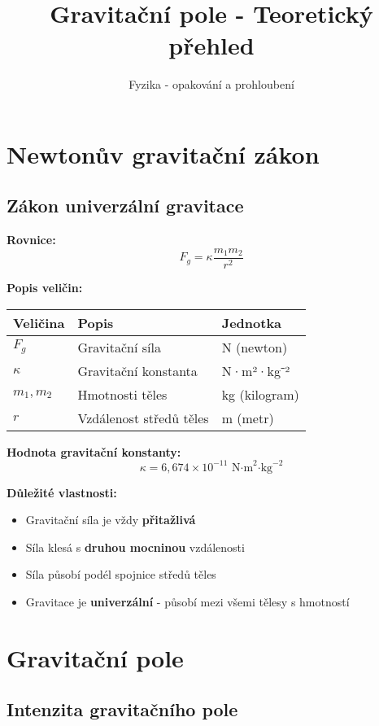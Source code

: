 \documentclass[11pt,a4paper]{article}
\title{Gravitační pole - Teoretický přehled}
\author{Fyzika - opakování a prohloubení}
\date{}
\begin{document}
\maketitle

\section{Newtonův gravitační zákon}

\subsection{Zákon univerzální gravitace}

\textbf{Rovnice:}
\[F_g = \kappa \frac{m_1 m_2}{r^2}\]

\textbf{Popis veličin:}

\begin{longtable}{lll}
\toprule
Veličina & Popis & Jednotka \\
\midrule
$F_g$ & Gravitační síla & N (newton) \\
$\kappa$ & Gravitační konstanta & N·m²·kg⁻² \\
$m_1, m_2$ & Hmotnosti těles & kg (kilogram) \\
$r$ & Vzdálenost středů těles & m (metr) \\
\bottomrule
\end{longtable}

\textbf{Hodnota gravitační konstanty:}
\[\kappa = 6{,}674 \times 10^{-11} \text{ N·m}^2\text{·kg}^{-2}\]

\textbf{Důležité vlastnosti:}

\begin{itemize}
\item Gravitační síla je vždy \textbf{přitažlivá}
\item Síla klesá s \textbf{druhou mocninou} vzdálenosti
\item Síla působí podél spojnice středů těles
\item Gravitace je \textbf{univerzální} - působí mezi všemi tělesy s hmotností
\end{itemize}

\clearpage

\section{Gravitační pole}

\subsection{Intenzita gravitačního pole}
\end{document}
